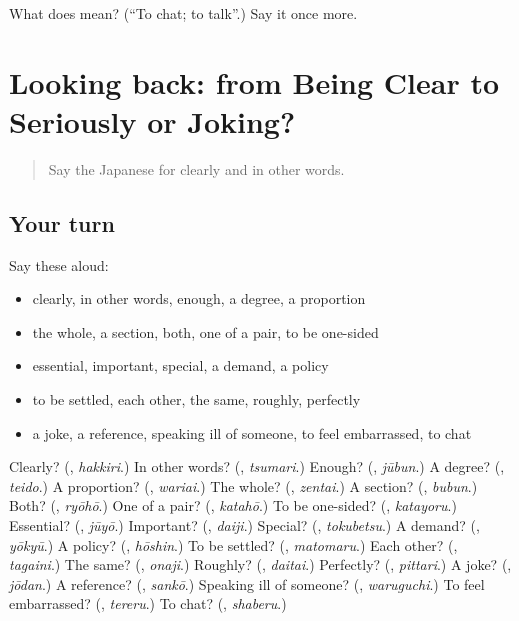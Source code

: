 \begin{tcolorbox}[breakable,colback=teal!4,colframe=teal!35!black,title={Before you move on}]
What does  mean? (\textquotedblleft{}To chat; to talk\textquotedblright{}.) Say it once more.
\end{tcolorbox}
\section[(dialogue)]{Looking back: from Being Clear to Seriously or Joking?}

\label{lesson:JA-R371-review-367-371}



\begin{quote}
Say the Japanese for clearly and in other words.
\end{quote}

\subsection*{Your turn}
Say these aloud:

\begin{itemize}
\raggedright
  \item clearly, in other words, enough, a degree, a proportion
  \item the whole, a section, both, one of a pair, to be one-sided
  \item essential, important, special, a demand, a policy
  \item to be settled, each other, the same, roughly, perfectly
  \item a joke, a reference, speaking ill of someone, to feel embarrassed, to chat
\end{itemize}

\begin{tcolorbox}[breakable,colback=teal!4,colframe=teal!35!black,title={Before you move on}]
Clearly? (\textbf{}, \emph{hakkiri}.) In other words? (\textbf{}, \emph{tsumari}.) Enough? (\textbf{}, \emph{jūbun}.) A degree? (\textbf{}, \emph{teido}.) A proportion? (\textbf{}, \emph{wariai}.) The whole? (\textbf{}, \emph{zentai}.) A section? (\textbf{}, \emph{bubun}.) Both? (\textbf{}, \emph{ryōhō}.) One of a pair? (\textbf{}, \emph{katahō}.) To be one-sided? (\textbf{}, \emph{katayoru}.) Essential? (\textbf{}, \emph{jūyō}.) Important? (\textbf{}, \emph{daiji}.) Special? (\textbf{}, \emph{tokubetsu}.) A demand? (\textbf{}, \emph{yōkyū}.) A policy? (\textbf{}, \emph{hōshin}.) To be settled? (\textbf{}, \emph{matomaru}.) Each other? (\textbf{}, \emph{tagaini}.) The same? (\textbf{}, \emph{onaji}.) Roughly? (\textbf{}, \emph{daitai}.) Perfectly? (\textbf{}, \emph{pittari}.) A joke? (\textbf{}, \emph{jōdan}.) A reference? (\textbf{}, \emph{sankō}.) Speaking ill of someone? (\textbf{}, \emph{waruguchi}.) To feel embarrassed? (\textbf{}, \emph{tereru}.) To chat? (\textbf{}, \emph{shaberu}.)
\end{tcolorbox}
